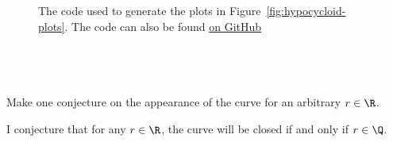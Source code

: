 \documentclass[a4paper]{article}
\begin{document}
\begin{figure}[hbtp]
	\centering
	\inputminted{python}{./code/generate_plots.py}
	\caption{The code used to generate the plots in Figure~\ref{fig:hypocycloid-plots}. The code can also be found \href{https://github.com/DoctorDalek1963/uni/blob/fe244f6880c7df0d801d426ca7ef9149b585ec2f/first-year/MA144-Methods-of-Mathematical-Modelling-2/Ass 1/code/generate_plots.py}{on GitHub}}
\end{figure}

\subsection{~} %

\begin{questionbody}
Make one conjecture on the appearance of the curve for an arbitrary $r \in \R$.
\end{questionbody}

I conjecture that for any $r \in \R$, the curve will be closed if and only if $r \in \Q$.
\end{document}
